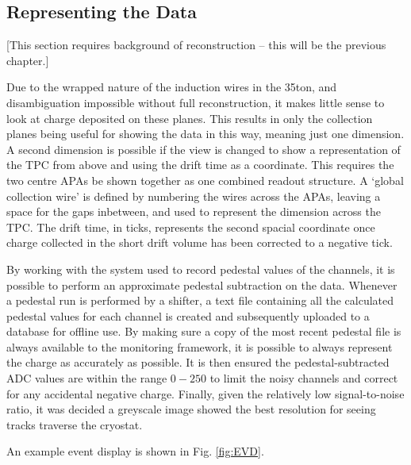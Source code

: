 \subsection{Representing the Data}\label{RepresentingEVDData}

[This section requires background of reconstruction -- this will be the previous chapter.]

Due to the wrapped nature of the induction wires in the 35ton, and disambiguation impossible without full reconstruction, it makes little sense to look at charge deposited on these planes.  This results in only the collection planes being useful for showing the data in this way, meaning just one dimension.  A second dimension is possible if the view is changed to show a representation of the TPC from above and using the drift time as a coordinate.  This requires the two centre APAs be shown together as one combined readout structure.  A `global collection wire' is defined by numbering the wires across the APAs, leaving a space for the gaps inbetween, and used to represent the dimension across the TPC.  The drift time, in ticks, represents the second spacial coordinate once charge collected in the short drift volume has been corrected to a negative tick.

By working with the system used to record pedestal values of the channels, it is possible to perform an approximate pedestal subtraction on the data.  Whenever a pedestal run is performed by a shifter, a text file containing all the calculated pedestal values for each channel is created and subsequently uploaded to a database for offline use.  By making sure a copy of the most recent pedestal file is always available to the monitoring framework, it is possible to always represent the charge as accurately as possible.  It is then ensured the pedestal-subtracted ADC values are within the range $0-250$ to limit the noisy channels and correct for any accidental negative charge.  Finally, given the relatively low signal-to-noise ratio, it was decided a greyscale image showed the best resolution for seeing tracks traverse the cryostat.

An example event display is shown in Fig. \ref{fig:EVD}.


